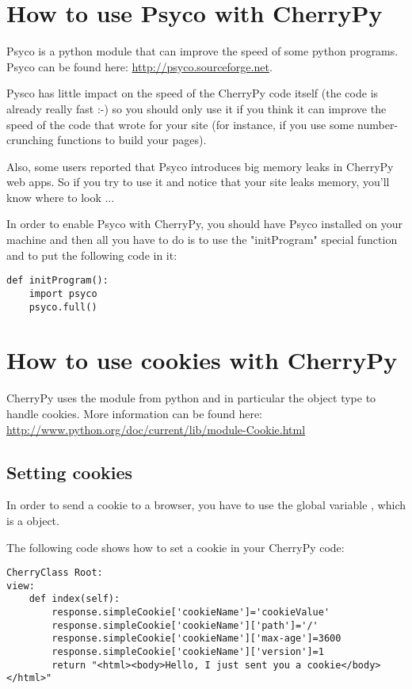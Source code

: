 \documentclass{manual}
\begin{document}
\chapter{How to use Psyco with CherryPy}

Psyco is a python module that can improve the speed of some python programs. Psyco can be found here:
\url{http://psyco.sourceforge.net}.

Pysco has little impact on the speed of the CherryPy code itself (the code is already really fast :-) so you should only use it if you think it
can improve the speed of the code that  wrote for your site (for instance, if you use some number-crunching functions to build your pages).

Also, some users reported that Psyco introduces big memory leaks in CherryPy web apps. So if you try to use it and notice that your site leaks
memory, you'll know where to look ...

In order to enable Psyco with CherryPy, you should have Psyco installed on your machine and then all you have to do
is to use the "initProgram" special function and to put the following code
in it:
\begin{verbatim}
def initProgram():
    import psyco
    psyco.full()
\end{verbatim}

\chapter{How to use cookies with CherryPy}
CherryPy uses the  module from python and in particular the  object type to handle cookies.
More information can be found here: \url{http://www.python.org/doc/current/lib/module-Cookie.html}

\section{Setting cookies}
In order to send a cookie to a browser, you have to use the global variable , which is
a  object.

The following code shows how to set a cookie in your CherryPy code:
\begin{verbatim}
CherryClass Root:
view:
    def index(self):
        response.simpleCookie['cookieName']='cookieValue'
        response.simpleCookie['cookieName']['path']='/'
        response.simpleCookie['cookieName']['max-age']=3600
        response.simpleCookie['cookieName']['version']=1
        return "<html><body>Hello, I just sent you a cookie</body></html>"
\end{verbatim}
\end{document}
